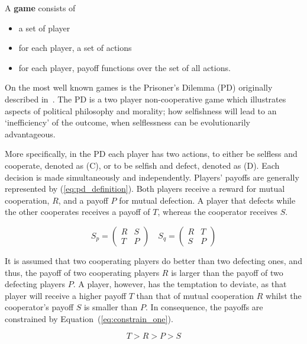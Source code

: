 \begin{definition}
A \textbf{game} consists of
\begin{itemize}
    \item a set of player
    \item for each player, a set of actions
    \item for each player, payoff functions over the set of all actions.
\end{itemize}
\end{definition}

On the most well known games is the Prisoner's Dilemma (PD) originally
described in~\cite{Flood1958}. The PD is a two player non-cooperative game which
illustrates aspects of political philosophy and morality; how selfishness will
lead to an `inefficiency' of the outcome, when selflessness can be
evolutionarily advantageous.

More specifically, in the PD each player has two actions, to either be selfless
and cooperate, denoted as (C), or to be selfish and defect, denoted as (D). Each
decision is made simultaneously and independently. Players' payoffs are
generally represented by (\ref{eq:pd_definition}). Both players receive a reward
for mutual cooperation, \(R\), and a payoff \(P\) for mutual defection. A player
that defects while the other cooperates receives a payoff of \(T\), whereas the
cooperator receives \(S\).

\begin{equation}\label{eq:pd_definition}
    S_p =
    \begin{pmatrix}
        R & S  \\
        T & P
    \end{pmatrix}
    \quad
    S_q =
    \begin{pmatrix}
        R & T  \\
        S & P
    \end{pmatrix}
\end{equation}

It is assumed that two cooperating players do better than two defecting ones,
and thus, the payoff of two cooperating players \(R\) is
larger than the payoff of two defecting players \(P\). A player, however, has the
temptation to deviate, as that player will receive a higher payoff \(T\) than
that of mutual cooperation \(R\) whilst the cooperator's payoff \(S\) is smaller than
\(P\). In consequence, the payoffs are constrained by
Equation~(\ref{eq:constrain_one}).

\begin{equation}\label{eq:constrain_one}
    T > R > P > S
\end{equation}

